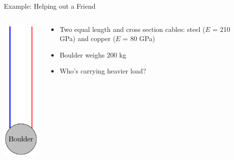 \documentclass[10pt, svgnames]{beamer}
\begin{document}
\begin{frame}[label={sec:org61f0e78}]{Example: Helping out a Friend}
\begin{columns}
\begin{column}{0.3\columnwidth}
\begin{center}
\includegraphics[height=0.7\textheight]{./pictures/2-guys-one-boulder.pdf}
\end{center}
\end{column}

\begin{column}{0.7\columnwidth}
\begin{itemize}
\item Two equal length and cross section cables: steel (\(E\) = 210 GPa) and
copper (\(E\) = 80 GPa)

\item Boulder weighs 200 kg

\item Who's carrying heavier load?
\end{itemize}
\end{column}
\end{columns}
\end{frame}
\end{document}
